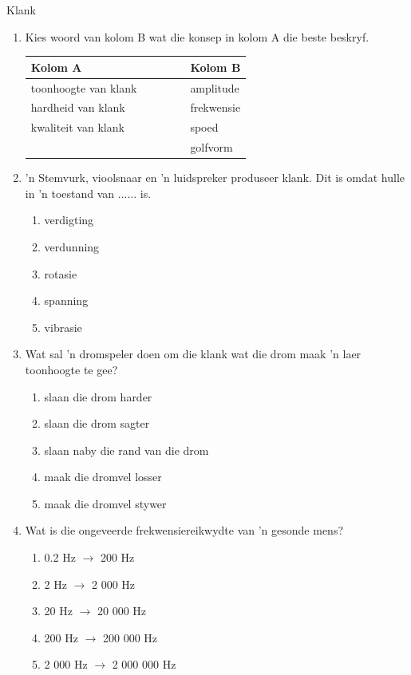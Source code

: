 \begin{eocexercises}{Klank}
            \nopagebreak
\begin{enumerate}[noitemsep, label=\textbf{\arabic*}. ] 
\item Kies \n woord van kolom B wat die konsep in kolom A die beste beskryf. 
          \begin{center}
\begin{tabular}{ll}
\textbf{Kolom A} & \textbf{Kolom B} \\ \hline
toonhoogte van klank \ \ \ & amplitude \\
hardheid van klank \ \ \ \ \ \ \ \ \ & frekwensie \\
kwaliteit van klank \ \ \ & spoed \\
& golfvorm \\
\end{tabular}
\end{center}
    \par
\item 'n Stemvurk, vioolsnaar en 'n luidspreker produseer klank. Dit is omdat hulle in 'n toestand van ...... is.
\begin{enumerate}[noitemsep, label=\textbf{\alph*}. ] 
    \item verdigting
    \item verdunning
    \item rotasie
    \item spanning
    \item vibrasie
\end{enumerate}

\item Wat sal 'n dromspeler doen om die klank wat die drom maak 'n laer toonhoogte te gee?
\begin{enumerate}[noitemsep, label=\textbf{\alph*}. ] 
    \item slaan die drom harder
    \item slaan die drom sagter
    \item slaan naby die rand van die drom
    \item maak die dromvel losser
    \item maak die dromvel stywer
\end{enumerate}

\item Wat is die ongeveerde frekwensiereikwydte van 'n gesonde mens?
\begin{enumerate}[noitemsep, label=\textbf{\alph*}. ] 
\item 0.2 Hz $\to $ 200 Hz
\item 2 Hz $\to $ 2 000 Hz
\item 20 Hz $\to $ 20 000 Hz
\item 200 Hz $\to $ 200 000 Hz
\item 2 000 Hz $\to $ 2 000 000 Hz
\end{enumerate}
                

\end{enumerate}
\end{eocexercises}
